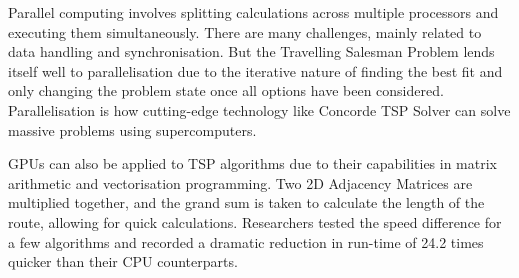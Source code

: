 Parallel computing involves splitting calculations across multiple processors and executing them simultaneously\cite {Parallel-computing}. There are many challenges, mainly related to data handling and synchronisation\cite{Navarro_Hitschfeld-Kahler_Mateu_2014}. But the Travelling Salesman Problem lends itself well to parallelisation due to the iterative nature of finding the best fit and only changing the problem state once all options have been considered\cite{KINDERVATER1989249}. Parallelisation is how cutting-edge technology like Concorde TSP Solver can solve massive problems using supercomputers\cite{applegate2003implementing}.

GPUs can also be applied to TSP algorithms\cite{applegate2003implementing} due to their capabilities in matrix arithmetic and vectorisation programming. Two 2D Adjacency Matrices are multiplied together, and the grand sum is taken to calculate the length of the route, allowing for quick calculations. Researchers tested the speed difference for a few algorithms and recorded a dramatic reduction in run-time of 24.2 times quicker than their CPU counterparts\cite{GPU}.
